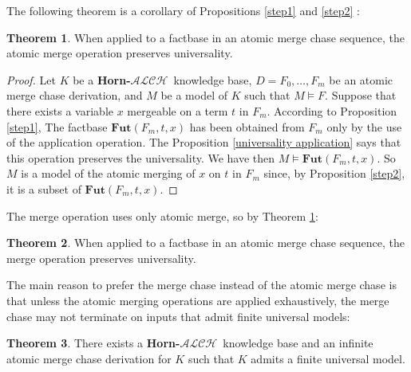 \documentclass{article}
\theoremstyle{definition}
\newtheorem{theorem}{Theorem}[section]
\theoremstyle{remark}
\newcommand{\Fut}{\textbf{Fut}}
\newcommand{\ALCH}{\textbf{Horn-$\mathcal{ALCH}$}}
\begin{document}
The following theorem is a corollary of Propositions \ref{step1} and \ref{step2} :

\begin{theorem} \label{universality atomic merge}
When applied to a factbase in an atomic merge chase sequence, the atomic merge operation preserves universality.
\end{theorem}

\begin{proof}
Let $K$ be a \ALCH\ knowledge base, $D=F_0,\ldots, F_m$ be an atomic merge chase derivation, and $M$ be a model of $K$ such that $M \models F$. Suppose that there exists a variable $x$ mergeable on a term $t$ in $F_m$. According to Proposition \ref{step1}, The factbase $\Fut(F_m,t,x)$ has been obtained from $F_m$ only by the use of the application operation. The Proposition \ref{universality application} says that this operation preserves the universality. We have then $M \models \Fut(F_m,t,x)$. So $M$ is a model of the atomic merging of $x$ on $t$ in $F_m$ since, by Proposition \ref{step2}, it is a subset of $\Fut(F_m,t,x)$.
\end{proof}





The merge operation uses only atomic merge, so by Theorem \ref{universality atomic merge}:

\begin{theorem} \label{universality merge}
When applied to a factbase in an atomic merge chase sequence, the merge operation preserves universality.
\end{theorem}


The main reason to prefer the merge chase instead of the atomic merge chase is that unless the atomic merging operations are applied exhaustively, the merge chase may not terminate on inputs that admit finite universal models:


\begin{theorem} \label{necessity of atomic merge}
There exists a \ALCH\ knowledge base and an infinite atomic merge chase derivation for $K$ such that $K$ admits a finite universal model.
\end{theorem}
\end{document}
